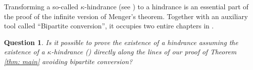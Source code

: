 \documentclass[12pt,a4paper]{amsart}
\theoremstyle{plain}
\newtheorem{question}[theorem]{Question}
\theoremstyle{definition}
\begin{document}
Transforming a so-called $ \kappa $-hindrance (see \cite[p. 35-36]{aharoni2009menger}) to a hindrance is an essential part of 
the proof of the infinite version of Menger's theorem.  Together with an auxiliary tool called ``Bipartite conversion'', it occupies two entire chapters 
in \cite{aharoni2009menger}.

\begin{question}
Is it possible to prove the existence of a hindrance assuming the existence of a $ 
\kappa $-hindrance (\cite[Theorem 7.30]{aharoni2009menger}) directly along the lines of our 
proof of Theorem \ref{thm: main} avoiding bipartite conversion?
\end{question}

\printbibliography
\end{document}
